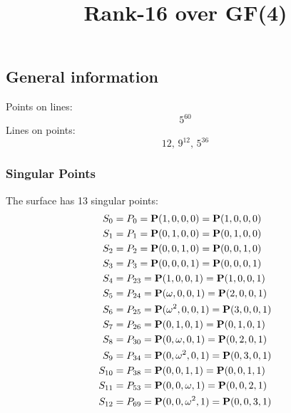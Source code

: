 \documentclass{article}
\newcommand\setTBstruts{\def\T{\rule{0pt}{2.6ex}}%
\def\B{\rule[-1.2ex]{0pt}{0pt}}}
\newcommand{\bP}{{\bf P}}
\begin{document}
 
\setTBstruts



{\allowdisplaybreaks%






\title{Rank-16 over GF(4)}
\author{}%
\maketitle%
%
{}



\subsection*{General information}
Points on lines:
$$
5^{60}$$
Lines on points:
$$
12,\,9^{12},\,5^{36}$$
\subsubsection*{Singular Points}
The surface has 13 singular points:\\
\begin{align*}
S_{0} &= P_{0}=\bP(1, 0, 0, 0) = \bP(1, 0, 0, 0)\\
S_{1} &= P_{1}=\bP(0, 1, 0, 0) = \bP(0, 1, 0, 0)\\
S_{2} &= P_{2}=\bP(0, 0, 1, 0) = \bP(0, 0, 1, 0)\\
S_{3} &= P_{3}=\bP(0, 0, 0, 1) = \bP(0, 0, 0, 1)\\
S_{4} &= P_{23}=\bP(1, 0, 0, 1) = \bP(1, 0, 0, 1)\\
S_{5} &= P_{24}=\bP(\omega , 0, 0, 1) = \bP(2, 0, 0, 1)\\
S_{6} &= P_{25}=\bP(\omega^{2}, 0, 0, 1) = \bP(3, 0, 0, 1)\\
S_{7} &= P_{26}=\bP(0, 1, 0, 1) = \bP(0, 1, 0, 1)\\
S_{8} &= P_{30}=\bP(0, \omega , 0, 1) = \bP(0, 2, 0, 1)\\
S_{9} &= P_{34}=\bP(0, \omega^{2}, 0, 1) = \bP(0, 3, 0, 1)\\
S_{10} &= P_{38}=\bP(0, 0, 1, 1) = \bP(0, 0, 1, 1)\\
S_{11} &= P_{53}=\bP(0, 0, \omega , 1) = \bP(0, 0, 2, 1)\\
S_{12} &= P_{69}=\bP(0, 0, \omega^{2}, 1) = \bP(0, 0, 3, 1)\\
\end{align*}
}
\end{document}
